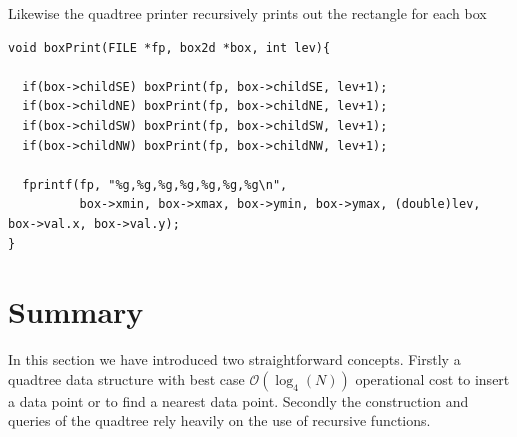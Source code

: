 Likewise the quadtree printer recursively prints out the rectangle for each box

\begin{verbatim}
void boxPrint(FILE *fp, box2d *box, int lev){

  if(box->childSE) boxPrint(fp, box->childSE, lev+1);
  if(box->childNE) boxPrint(fp, box->childNE, lev+1);
  if(box->childSW) boxPrint(fp, box->childSW, lev+1);
  if(box->childNW) boxPrint(fp, box->childNW, lev+1);

  fprintf(fp, "%g,%g,%g,%g,%g,%g,%g\n",
          box->xmin, box->xmax, box->ymin, box->ymax, (double)lev, box->val.x, box->val.y);
}
\end{verbatim}

\section{Summary}

In this section we have introduced two straightforward concepts. Firstly a quadtree data structure with best case $\mathcal{O}(\log_4(N))$ operational cost to insert a data point or to find a nearest data point. Secondly the construction and queries of the quadtree rely heavily on the use of recursive functions.

\printbibliography[heading=subbibliography]